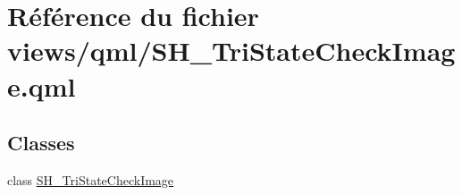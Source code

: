 \hypertarget{SH__TriStateCheckImage_8qml}{\section{Référence du fichier views/qml/\-S\-H\-\_\-\-Tri\-State\-Check\-Image.qml}
\label{SH__TriStateCheckImage_8qml}
}
\subsection*{Classes}
\begin{DoxyCompactItemize}
\item 
class \hyperlink{classSH__TriStateCheckImage}{S\-H\-\_\-\-Tri\-State\-Check\-Image}
\end{DoxyCompactItemize}
